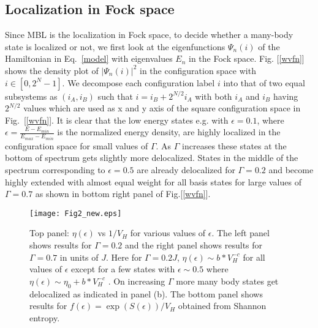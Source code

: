 \documentclass[prl,aps,twocolumn,floats,nofootinbib]{revtex4}
\begin{document}
\subsection{Localization in Fock space}
Since MBL is the localization in Fock space, to decide whether a many-body state is localized or not, we first look at the eigenfunctions $\Psi_n(i)$ of the Hamiltonian in Eq.~\ref{model} with eigenvalues $E_n$ in the Fock space. Fig. [\ref{wvfn}] shows the density plot of $|\Psi_n(i)|^2$ in the configuration space with $i\in[0,2^N-1]$. We decompose each configuration label $i$ into that of two equal subsystems as $(i_A,i_B)$ such that $i=i_B+2^{N/2}i_A$ with both $i_A$ and $i_B$ having $2^{N/2}$ values which are used as x and y axis of the square configuration space in Fig.~[\ref{wvfn}]. It is clear that the low energy states e.g. with $\epsilon=0.1$, where $\epsilon =  \frac{E-E_{min}}{E_{max} - E_{min}}$ is the normalized energy density, are highly localized in the configuration space for small values of $\Gamma$. As $\Gamma$ increases these states at the bottom of spectrum gets slightly more delocalized. States in the middle of the spectrum corresponding to $\epsilon=0.5$ are already delocalized for $\Gamma=0.2$ and become highly extended with almost equal weight for all basis states for large values of $\Gamma=0.7$ as shown in bottom right panel of Fig.[\ref{wvfn}]. 
 \begin{figure}[h!]
\begin{center}
\texttt{[image: Fig2\_new.eps]}
\caption{Top panel: $\eta(\epsilon)$ vs $1/V_H$ for various values of $\epsilon$. The left panel shows results for $\Gamma=0.2$ and the right panel shows results for $\Gamma=0.7$ in units of $J$. Here for $\Gamma=0.2J$, $\eta(\epsilon) \sim b*V_H^{-c}$ for all values of $\epsilon$ except for a few states with $\epsilon \sim 0.5$ where  $\eta(\epsilon)\sim \eta_0+b*V_H^{-c}$ .
On increasing $\Gamma$ more many body states get delocalized as indicated in panel (b). The bottom panel shows results for $f(\epsilon)=\exp(S(\epsilon))/V_H$ obtained from Shannon entropy.}
\label{NPR}
\end{center}
\end{figure}
\end{document}
